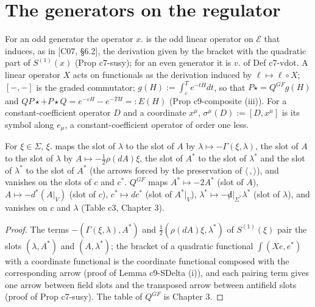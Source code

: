 \section{The generators on the regulator}
\label{sec:qs-reg}

For an odd generator the operator $x.$ is the odd linear operator on $\mathscr E$ that induces, as in [C07, §6.2], the derivation given by the bracket with the quadratic part of $S^{(1)}(x)$ (Prop c7-susy); for an even generator it is $v.$ of Def c7-vdot. A linear operator $X$ acts on functionals as the derivation induced by $\ell\mapsto\ell\circ X$; $[-,-]$ is the graded commutator; $g(H):=\int_\varepsilon^Te^{-tH}dt$, so that $P\star=Q^{GF}g(H)$ and $QP\star+P\star Q=e^{-\varepsilon H}-e^{-TH}=:E(H)$ (Prop c9-composite (iii)). For a constant-coefficient operator $D$ and a coordinate $x^\mu$, $\sigma^\mu(D):=[D,x^\mu]$ is its symbol along $e_\mu$, a constant-coefficient operator of order one less.

\begin{lemma}
\label{lem:qs-arrows}
For $\xi\in\Sigma$, $\xi.$ maps the slot of $\lambda$ to the slot of $A$ by $\lambda\mapsto-\Gamma(\xi,\lambda)$, the slot of $A$ to the slot of $\lambda$ by $A\mapsto-\tfrac12\rho(dA)\xi$, the slot of $A^*$ to the slot of $\lambda^*$ and the slot of $\lambda^*$ to the slot of $A^*$ (the arrows forced by the preservation of $\langle\,,\rangle$), and vanishes on the slots of $c$ and $c^*$. $Q^{GF}$ maps $A^*\mapsto-2A^*$ (slot of $A$), $A\mapsto-d^*(A|_V)$ (slot of $c$), $c^*\mapsto dc^*$ (slot of $A^*|_V$), $\lambda^*\mapsto-{\not d}|_{\Sigma^*}\lambda^*$ (slot of $\lambda$), and vanishes on $c$ and $\lambda$ (Table c3, Chapter 3).
\end{lemma}

\begin{proof}
The terms $-(\Gamma(\xi,\lambda),A^*)$ and $\tfrac12(\rho(dA)\xi,\lambda^*)$ of $S^{(1)}(\xi)$ pair the slots $(\lambda,A^*)$ and $(A,\lambda^*)$; the bracket of a quadratic functional $\int(Xe,e^*)$ with a coordinate functional is the coordinate functional composed with the corresponding arrow (proof of Lemma c9-SDelta (i)), and each pairing term gives one arrow between field slots and the transposed arrow between antifield slots (proof of Prop c7-susy). The table of $Q^{GF}$ is Chapter 3.
\end{proof}

